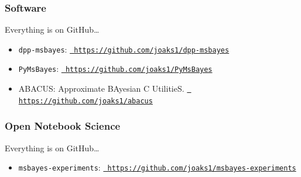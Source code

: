\begin{frame}
    \frametitle{Software}
    Everything is on GitHub\ldots\\
    \smallskip
    \begin{itemize}
        \item \texttt{dpp-msbayes}:
            \href{https://github.com/joaks1/dpp-msbayes}{\tt
            https://github.com/joaks1/dpp-msbayes}

        \item \texttt{PyMsBayes}:
            \href{https://github.com/joaks1/PyMsBayes}{\tt
            https://github.com/joaks1/PyMsBayes}

        \item ABACUS: Approximate BAyesian C UtilitieS.
            \href{https://github.com/joaks1/abacus}{\tt
            https://github.com/joaks1/abacus}
    \end{itemize}
\end{frame}

\begin{frame}
    \frametitle{Open Notebook Science}
    Everything is on GitHub\ldots\\
    \smallskip
    \begin{itemize}
        \item \texttt{msbayes-experiments}:
            \href{https://github.com/joaks1/msbayes-experiments}{\tt
            https://github.com/joaks1/msbayes-experiments}
    \end{itemize}
\end{frame}


